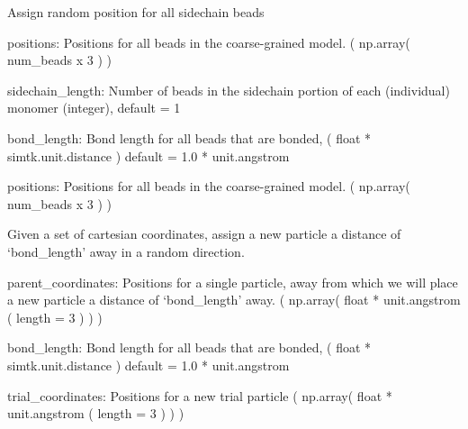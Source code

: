\documentclass[letterpaper,10pt,english,openany,oneside]{sphinxmanual}
\begin{document}

\begin{fulllineitems}
\label{\detokenize{util:util.assign_sidechain_beads}}
Assign random position for all sidechain beads

positions: Positions for all beads in the coarse-grained model.
( np.array( num\_beads x 3 ) )

sidechain\_length: Number of beads in the sidechain
portion of each (individual) monomer (integer), default = 1

bond\_length: Bond length for all beads that are bonded,
( float * simtk.unit.distance )
default = 1.0 * unit.angstrom

positions: Positions for all beads in the coarse-grained model.
( np.array( num\_beads x 3 ) )

\end{fulllineitems}


\begin{fulllineitems}
\label{\detokenize{util:util.attempt_move}}
Given a set of cartesian coordinates, assign a new particle
a distance of ‘bond\_length’ away in a random direction.

parent\_coordinates: Positions for a single particle,
away from which we will place a new particle a distance
of ‘bond\_length’ away.
( np.array( float * unit.angstrom ( length = 3 ) ) )

bond\_length: Bond length for all beads that are bonded,
( float * simtk.unit.distance )
default = 1.0 * unit.angstrom

trial\_coordinates: Positions for a new trial particle
( np.array( float * unit.angstrom ( length = 3 ) ) )

\end{fulllineitems}

\end{document}

